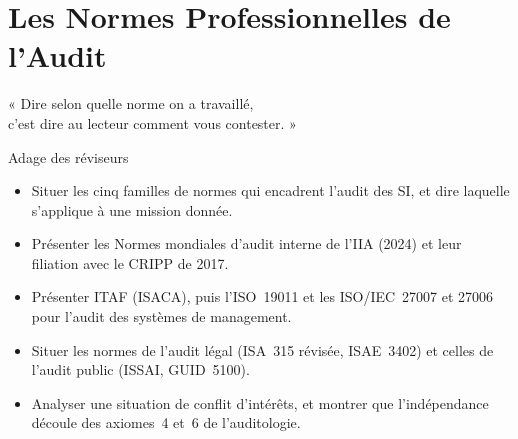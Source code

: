 
\chapter{Les Normes Professionnelles de l'Audit}
\label{chap:normes}

\epigraph{%
    « Dire selon quelle norme on a travaillé,\\
    c'est dire au lecteur comment vous contester. »%
}{Adage des réviseurs}


\begin{boxobjectifs}
\begin{itemize}
    \item Situer les cinq familles de normes qui encadrent l'audit des SI,
          et dire laquelle s'applique à une mission donnée.
    \item Présenter les Normes mondiales d'audit interne de l'IIA (2024) et
          leur filiation avec le CRIPP de 2017.
    \item Présenter ITAF (ISACA), puis l'ISO~19011 et les ISO/IEC~27007 et
          27006 pour l'audit des systèmes de management.
    \item Situer les normes de l'audit légal (ISA~315 révisée, ISAE~3402)
          et celles de l'audit public (ISSAI, GUID~5100).
    \item Analyser une situation de conflit d'intérêts, et montrer que
          l'indépendance découle des axiomes~4 et~6 de l'auditologie.
\end{itemize}
\end{boxobjectifs}

